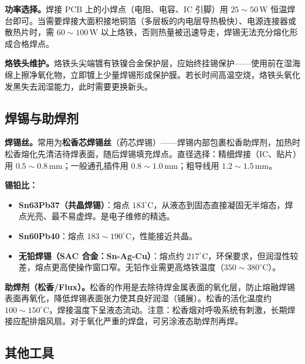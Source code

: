 \documentclass[12pt,UTF8]{ctexbook}
\begin{document}
\textbf{功率选择。}焊接 PCB 上的小焊点（电阻、电容、IC 引脚）用 $25\sim50\,\mathrm{W}$ 恒温焊台即可。当需要焊接大面积接地铜箔（多层板的内电层导热极快）、电源连接器或散热片时，需 $60\sim100\,\mathrm{W}$ 以上烙铁，否则热量被迅速导走，焊锡无法充分熔化形成合格焊点。

\textbf{烙铁头维护。}烙铁头尖端镀有铁镍合金保护层，应始终挂锡保护——使用前在湿海绵上擦净氧化物，立即镀上少量焊锡形成保护膜。若长时间高温空烧，烙铁头氧化发黑失去润湿能力，此时需要更换新头。

\subsection{焊锡与助焊剂}

\textbf{焊锡丝。}常用为\textbf{松香芯焊锡丝}（药芯焊锡）——焊锡内部包裹松香助焊剂，加热时松香熔化先清洁待焊表面，随后焊锡填充焊点。直径选择：精细焊接（IC、贴片）用 $0.5\sim0.8\,\mathrm{mm}$；一般通孔插件用 $0.8\sim1.0\,\mathrm{mm}$；粗导线用 $1.2\sim1.5\,\mathrm{mm}$。

\textbf{锡铅比：}
\begin{itemize}
  \item \textbf{Sn63Pb37（共晶焊锡）}：熔点 $183^\circ\mathrm{C}$，从液态到固态直接凝固无半熔态，焊点光亮、最不易虚焊。是电子维修的精选。
  \item \textbf{Sn60Pb40}：熔点 $183\sim190^\circ\mathrm{C}$，性能接近共晶。
  \item \textbf{无铅焊锡（SAC 合金：Sn-Ag-Cu）}：熔点约 $217^\circ\mathrm{C}$，环保要求，但润湿性较差，熔点更高使操作窗口窄。无铅作业需更高烙铁温度（$350\sim380^\circ\mathrm{C}$）。
\end{itemize}

\textbf{助焊剂（松香/Flux）。}松香的作用是去除待焊金属表面的氧化层，防止熔融焊锡表面再氧化，降低焊锡表面张力使其良好润湿（铺展）。松香的活化温度约 $100\sim150^\circ\mathrm{C}$，焊接温度下呈液态流动。注意：松香烟对呼吸系统有刺激，长期焊接应配排烟风扇。对于氧化严重的焊盘，可另涂液态助焊剂再焊。

\subsection{其他工具}
\end{document}
